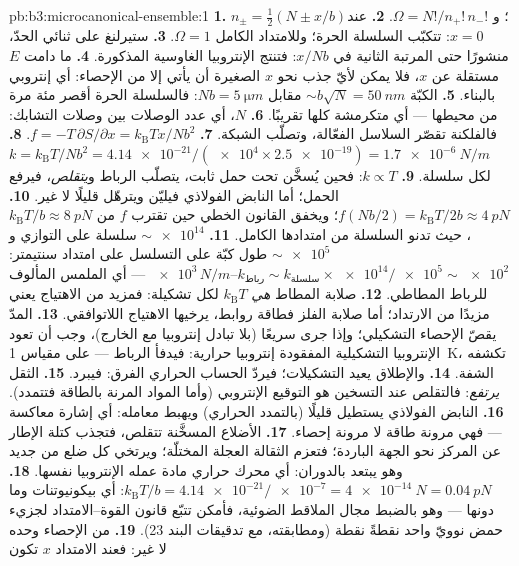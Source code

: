 \begin{solution}{pb:b3:microcanonical-ensemble:1}
\textbf{1.} $n_\pm = \tfrac12(N \pm x/b)$؛ و $\Omega =
N!/n_+!\,n_-!$.
\textbf{2.} عند $x = 0$: تتكبّب السلسلة الحرة؛ وللامتداد الكامل
$\Omega = 1$.
\textbf{3.} ستيرلنغ على ثنائي الحدّ، منشورًا حتى المرتبة الثانية في
$x/Nb$: فتنتج الإنتروبيا الغاوسية المذكورة.
\textbf{4.} ما دامت $E$ مستقلة عن $x$، فلا يمكن لأيّ جذب نحو $x$
الصغيرة أن يأتي إلا من الإحصاء: أي إنتروبي بالبناء.
\textbf{5.} الكبّة $\sim b\sqrt N = \qty{50}{nm}$ مقابل $Nb =
\qty{5}{\micro m}$: فالسلسلة الحرة أقصر مئة مرة
من محيطها --- أي متكرمشة كلها تقريبًا.
\textbf{6.} $N$، أي عدد الوصلات بين وصلات التشابك:
فالفلكنة تقصّر السلاسل الفعّالة، وتصلّب
الشبكة.
\textbf{7.} $f = -T\,\partial S/\partial x =
k_{\text{B}}Tx/Nb^2$.
\textbf{8.} $k = k_{\text{B}}T/Nb^2 = \num{4.14e-21}/(\num{e4}
\times \num{2.5e-19}) = \qty{1.7e-6}{N/m}$ لكل سلسلة.
\textbf{9.} $k \propto T$: فحين يُسخَّن تحت حمل ثابت، يتصلّب الرباط
و\emph{يتقلص}، فيرفع الحمل؛ أما النابض الفولاذي فيليّن
ويترهّل قليلًا لا غير.
\textbf{10.} $f(Nb/2) = k_{\text{B}}T/2b \approx \qty{4}{pN}$؛
ويخفق القانون الخطي حين تقترب $f$ من $k_{\text{B}}T/b \approx
\qty{8}{pN}$، حيث تدنو السلسلة من امتدادها الكامل.
\textbf{11.} $\sim\num{e14}$ سلسلة على التوازي و
$\sim\num{e5}$ طول كبّة على التسلسل على امتداد سنتيمتر:
$k_{\text{رباط}} \sim k_{\text{سلسلة}} \times \num{e14}/\num{e5}
\sim \num{e2}$--$\num{e3}\,\unit{N/m}$ --- أي الملمس المألوف
للرباط المطاطي.
\textbf{12.} صلابة المطاط \emph{هي} $k_{\text{B}}T$ لكل
تشكيلة: فمزيد من الاهتياج يعني مزيدًا من الارتداد؛ أما صلابة الفلز
فطاقة روابط، يرخيها الاهتياج اللاتوافقي.
\textbf{13.} المدّ يقصّ الإحصاء التشكيلي؛ وإذا جرى سريعًا
(بلا تبادل إنتروبيا مع الخارج)، وجب أن تعود الإنتروبيا التشكيلية
المفقودة إنتروبيا حرارية: فيدفأ الرباط ---
على مقياس \qty{1}{K}، تكشفه الشفة.
\textbf{14.} والإطلاق يعيد التشكيلات؛ فيردّ الحساب الحراري
الفرق: فيبرد.
\textbf{15.} الثقل \emph{يرتفع}: فالتقلص عند التسخين هو
التوقيع الإنتروبي (وأما المواد المرنة بالطاقة فتتمدد).
\textbf{16.} النابض الفولاذي يستطيل قليلًا (بالتمدد
الحراري) ويهبط معامله: أي إشارة معاكسة --- فهي مرونة
طاقة لا مرونة إحصاء.
\textbf{17.} الأضلاع المسخَّنة تتقلص، فتجذب كتلة الإطار
عن المركز نحو الجهة الباردة؛ فتعزم الثقالة العجلة المختلّة؛
ويرتخي كل ضلع من جديد وهو يبتعد بالدوران: أي محرك حراري
مادة عمله الإنتروبيا نفسها.
\textbf{18.} $k_{\text{B}}T/b = \num{4.14e-21}/\num{e-7} =
\qty{4e-14}{N} = \qty{0.04}{pN}$: أي بيكونيوتنات وما دونها ---
وهو بالضبط مجال الملاقط الضوئية، فأمكن تتبّع قانون القوة--الامتداد
لجزيء حمض نوويّ واحد نقطةً نقطة (ومطابقته،
مع تدقيقات البند 23).
\textbf{19.} من الإحصاء وحده لا غير: فعند الامتداد $x$ تكون

\end{solution}
